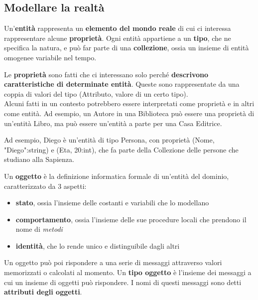 \documentclass[11pt, a4paper, titlepage, oneside]{scrbook}
\begin{document}
\subsection{Modellare la realtà}

\begin{Definizione}[Entità]
\label{def-entità}
Un'\textbf{entità} rappresenta un \textbf{elemento del mondo reale} di cui ci interessa rappresentare alcune \textbf{proprietà}. Ogni entità appartiene a un \textbf{tipo}, che ne specifica la natura, e può far parte di una \textbf{collezione}, ossia un insieme di entità omogenee variabile nel tempo.
\end{Definizione}

\begin{Definizione}
\label{def-prop-entita}
Le \textbf{proprietà} sono fatti che ci interessano solo perché \textbf{descrivono caratteristiche di determinate entità}. Queste sono rappresentate da una coppia di valori del tipo (Attributo, valore di un certo tipo). \\
\NB Alcuni fatti in un contesto potrebbero essere interpretati come proprietà e in altri come entità. Ad esempio, un Autore in una Biblioteca può essere una proprietà di un'entità Libro, ma può essere un'entità a parte per una Casa Editrice.
\end{Definizione}

Ad esempio, Diego è un'entità di tipo Persona, con proprietà (Nome, "Diego":string) e (Eta, 20:int), che fa parte della Collezione delle persone che studiano alla Sapienza.

\begin{Definizione}[Oggetto]
\label{def-oggetto}
Un \textbf{oggetto} è la definizione informatica formale di un'entità del dominio, caratterizzato da 3 aspetti:
\begin{itemize}
    \item \textbf{stato}, ossia l'insieme delle costanti e variabili che lo modellano
    \item \textbf{comportamento}, ossia l'insieme delle sue procedure locali che prendono il nome di \textit{metodi}
    \item \textbf{identità}, che lo rende unico e distinguibile dagli altri
\end{itemize}
Un oggetto può poi rispondere a una serie di messaggi attraverso valori memorizzati o calcolati al momento. Un \textbf{tipo oggetto} è l'insieme dei messaggi a cui un insieme di oggetti può rispondere. I nomi di questi messaggi sono detti \textbf{attributi degli oggetti}.
\end{Definizione}
\end{document}
